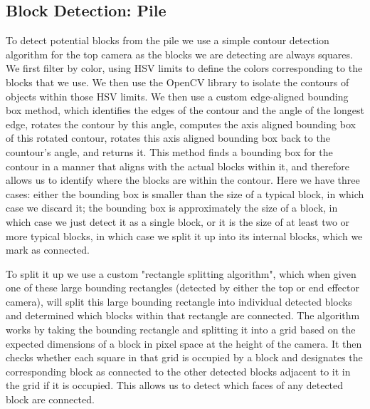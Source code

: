 \subsection{Block Detection: Pile}
To detect potential blocks from the pile we use a simple contour detection algorithm for the top camera as the blocks we are detecting are always squares. We first filter by color, using HSV limits to define the colors corresponding to the blocks that we use. We then use the OpenCV library to isolate the contours of objects within those HSV limits. We then use a custom edge-aligned bounding box method, which identifies the edges of the contour and the angle of the longest edge, rotates the contour by this angle, computes the axis aligned bounding box of this rotated contour, rotates this axis aligned bounding box back to the countour's angle, and returns it. This method finds a bounding box for the contour in a manner that aligns with the actual blocks within it, and therefore allows us to identify where the blocks are within the contour. Here we have three cases: either the bounding box is smaller than the size of a typical block, in which case we discard it; the bounding box is approximately the size of a block, in which case we just detect it as a single block, or it is the size of at least two or more typical blocks, in which case we split it up into its internal blocks, which we mark as connected.

\noindent To split it up we use a custom "rectangle splitting algorithm", which when given one of these large bounding rectangles (detected by either the top or end effector camera), will split this large bounding rectangle into individual detected blocks and determined which blocks within that rectangle are connected. The algorithm works by taking the bounding rectangle and splitting it into a grid based on the expected dimensions of a block in pixel space at the height of the camera. It then checks whether each square in that grid is occupied by a block and designates the corresponding block as connected to the other detected blocks adjacent to it in the grid if it is occupied. This allows us to detect which faces of any detected block are connected.

